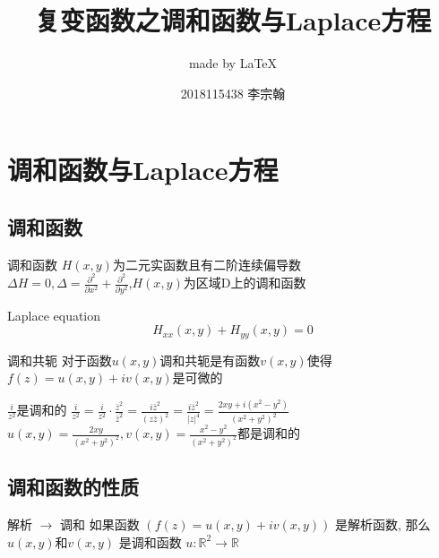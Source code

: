 \documentclass[cn,11pt,chinese,black]{elegantbook}
\title{复变函数之调和函数与Laplace方程}
\subtitle{made by \LaTeX{} }
\author{2018115438 李宗翰}
\institute{西南交大数学学院}
\begin{document}
	\maketitle
	\chapter{调和函数与Laplace方程}
	\section{调和函数}
	\begin{definition}{调和函数}
		\noindent$H(x,y)$为二元实函数且有二阶连续偏导数 \\
		$\Delta H=0,\Delta=\frac{\partial^{2}}{\partial x^{2}}+\frac{\partial^{2}}{\partial y^{2}}$,$H(x,y)$为区域D上的调和函数
	\end{definition}
	\begin{definition}{Laplace equation}
		$$H_{x x}(x, y)+H_{y y}(x, y)=0$$
	\end{definition}
	\begin{definition}{调和共轭} 
		对于函数$u(x, y)$调和共轭是有函数$v(x, y)$使得$f(z)=u(x, y)+i v(x, y)$是可微的
	\end{definition}
	\begin{example}
		$\frac{i}{z^{2}}$是调和的
		$\frac{i}{z^{2}}=\frac{i}{z^{2}} \cdot \frac{\bar{z}^{2}}{\bar{z}^{2}}=\frac{i \bar{z}^{2}}{(z \bar{z})^{2}}=\frac{i \bar{z}^{2}}{|z|^{4}}=\frac{2 x y+i\left(x^{2}-y^{2}\right)}{\left(x^{2}+y^{2}\right)^{2}}$\\
		$u(x, y)=\frac{2 x y}{\left(x^{2}+y^{2}\right)^{2}},v(x, y)=\frac{x^{2}-y^{2}}{\left(x^{2}+y^{2}\right)^{2}}$都是调和的
	\end{example}
	\section{调和函数的性质}
	
	\begin{theorem}{解析 $\rightarrow$ 调和}
		\noindent 如果函数 $(f(z)=u(x, y)+i v(x, y))$ 是解析函数, 那么 $u(x, y)$和$v(x, y)$ 是调和函数
		$u: \mathbb{R}^{2} \rightarrow \mathbb{R}$
	\end{theorem}
	
\end{document}
